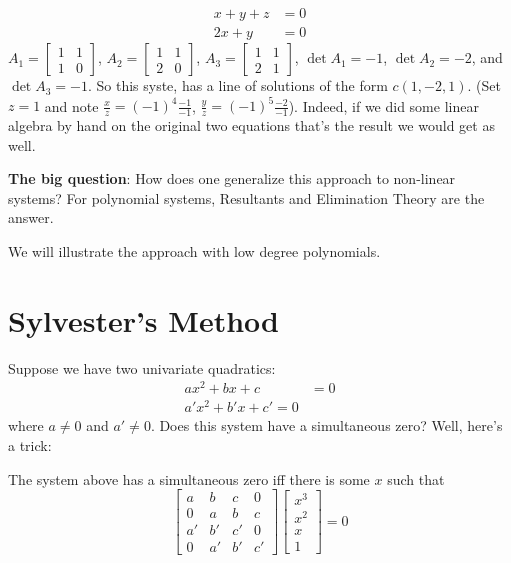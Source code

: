 \begin{example}
  \begin{align*}
    x + y + z &= 0 \\
    2x + y &= 0
  \end{align*}
  $A_1 =
  \begin{bmatrix}
    1 & 1 \\
    1 & 0
  \end{bmatrix}
  $, $A_2 =
  \begin{bmatrix}
    1 & 1 \\
    2 & 0
  \end{bmatrix}
$, $A_3 =
\begin{bmatrix}
  1 & 1 \\
  2 & 1
\end{bmatrix}
$, $\det A_1 = -1$, $\det A_2 = -2$, and $\det A_3 = -1$. So this
syste, has a line of solutions of the form $c(1, -2, 1)$. (Set $z = 1$
and note $\frac{x}{z} = (-1)^4\frac{-1}{-1}$, $\frac{y}{z} = (-1)^5
\frac{-2}{-1}$). Indeed, if we did some linear algebra by hand on the
original two equations that's the result we would get as well.
\end{example}

\textbf{The big question}: How does one generalize this approach to
non-linear systems? For polynomial systems, Resultants and Elimination
Theory are the answer.

We will illustrate the approach with low degree polynomials.

\section{Sylvester's Method}

Suppose we have two univariate quadratics:
\begin{align*}
  ax^2 + bx + c &= 0 \\
  a'x^2 + b'x + c' = 0
\end{align*}
where $a \neq 0$ and $a' \neq 0$. Does this system have a simultaneous
zero? Well, here's a trick:

The system above has a simultaneous zero iff there is some $x$ such
that
$$
  \begin{bmatrix}
    a & b & c & 0 \\
    0 & a & b & c \\
    a' & b' & c' & 0 \\
    0 & a' & b' & c'
  \end{bmatrix}
                  \begin{bmatrix}
                    x^3 \\ x^2 \\ x \\ 1
                  \end{bmatrix} = 0 $$

